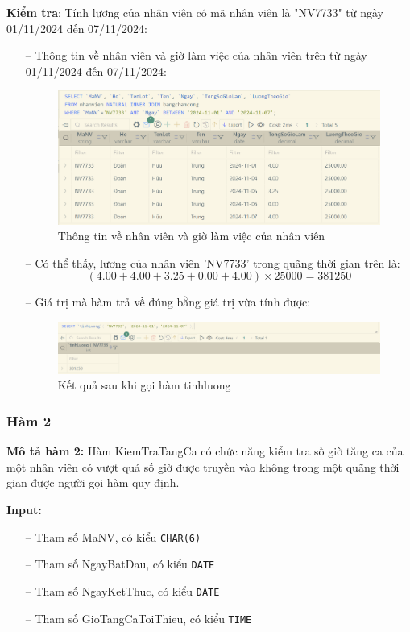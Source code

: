 \newpage
\textbf{Kiểm tra}: Tính lương của nhân viên có mã nhân viên là "NV7733" từ ngày 01/11/2024 đến 07/11/2024:
\begin{itemize}
    \item [--] Thông tin về nhân viên và giờ làm việc của nhân viên trên từ ngày 01/11/2024 đến 07/11/2024:
    \begin{figure}[H]
        \centering
        \includegraphics[width=\linewidth]{content/images/func_1_1.png}
        \caption{Thông tin về nhân viên và giờ làm việc của nhân viên}
        \label{fig:func_1_1}
    \end{figure}
    \item [--] Có thể thấy, lương của nhân viên 'NV7733' trong quãng thời gian trên là:
    $$
    (4.00 + 4.00 + 3.25 + 0.00 + 4.00) \times 25000 = 381250
    $$
    \item [--] Giá trị mà hàm trả về đúng bằng giá trị vừa tính được:
    \begin{figure}[H]
        \centering
        \includegraphics[width=\linewidth]{content/images/func_1_2.png}
        \caption{Kết quả sau khi gọi hàm tinhluong}
        \label{fig:func_1_2}
    \end{figure}
\end{itemize}

\newpage
\subsubsection{Hàm 2}
\textbf{Mô tả hàm 2:} Hàm KiemTraTangCa có chức năng kiểm tra số giờ tăng ca của một nhân viên có vượt quá số giờ được truyền vào không trong một quãng thời gian được người gọi hàm quy định.

\textbf{Input:} 
\begin{itemize}
    \item [--] Tham số MaNV, có kiểu \texttt{CHAR(6)} 
    \item [--] Tham số NgayBatDau, có kiểu \texttt{DATE} 
    \item [--] Tham số NgayKetThuc, có kiểu \texttt{DATE} 
    \item [--] Tham số GioTangCaToiThieu, có kiểu \texttt{TIME} 
\end{itemize}

